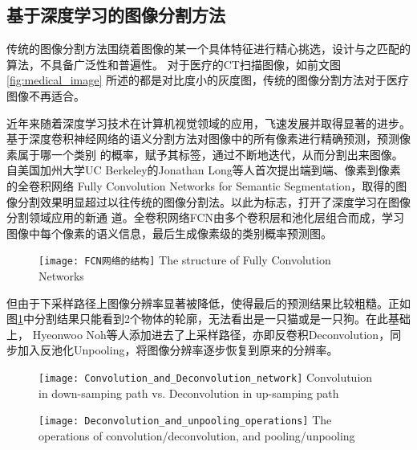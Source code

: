 	\subsection{基于深度学习的图像分割方法}
	
	传统的图像分割方法围绕着图像的某一个具体特征进行精心挑选，设计与之匹配的算法，不具备广泛性和普遍性。 对于医疗的CT扫描图像，如前文图\ref{fig:medical_image}
	所述的都是对比度小的灰度图，传统的图像分割方法对于医疗图像不再适合。
	
	近年来随着深度学习技术在计算机视觉领域的应用，飞速发展并取得显著的进步。 基于深度卷积神经网络的语义分割方法对图像中的所有像素进行精确预测，预测像素属于哪一个类别
	的概率，赋予其标签，通过不断地迭代，从而分割出来图像。自美国加州大学UC Berkeley的Jonathan Long等人\cite{long2015fully}首次提出端到端、像素到像素的全卷积网络
	Fully Convolution Networks for Semantic Segmentation，取得的图像分割效果明显超过以往传统的图像分割法。以此为标志，打开了深度学习在图像分割领域应用的新通
	道。全卷积网络FCN由多个卷积层和池化层组合而成，学习图像中每个像素的语义信息，最后生成像素级的类别概率预测图。
	\begin{figure}[!htp]
		\centering
		\texttt{[image: FCN网络的结构]}
			{The structure of Fully Convolution Networks}
		\label{fig:FCN}
	\end{figure}
	
	但由于下采样路径上图像分辨率显著被降低，使得最后的预测结果比较粗糙。正如图\ref{fig:FCN}中分割结果只能看到2个物体的轮廓，无法看出是一只猫或是一只狗。在此基础上，
	Hyeonwoo Noh等人\cite{Noh2015LearningDN}添加进去了上采样路径，亦即反卷积Deconvolution，同步加入反池化Unpooling，将图像分辨率逐步恢复到原来的分辨率。
	\begin{figure}[!htp]
		\centering
		\texttt{[image: Convolution\_and\_Deconvolution\_network]}
			{Convolutuion in down-samping path vs. Deconvolution in up-samping path}
		\label{fig:conv_deconv}
	\end{figure}
	\begin{figure}[!htp]
		\centering
		\texttt{[image: Deconvolution\_and\_unpooling\_operations]}
			{The operations of convolution/deconvolution, and pooling/unpooling}
		\label{fig:conv_deconv_pooling_unpooling}
	\end{figure}
	
